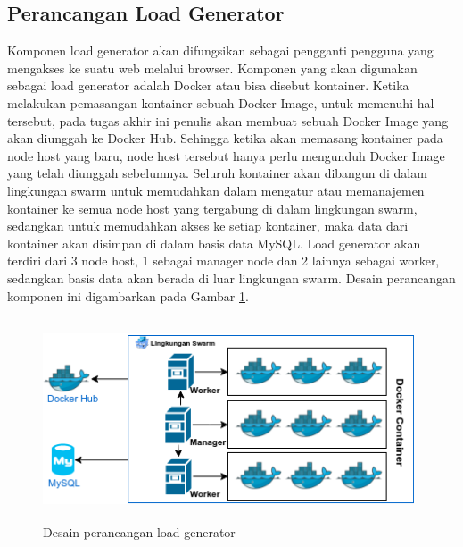     	\subsection{Perancangan Load Generator}
    		Komponen load generator akan difungsikan sebagai pengganti pengguna yang mengakses ke suatu web melalui browser. Komponen yang akan digunakan sebagai load generator adalah Docker atau bisa disebut kontainer. Ketika melakukan pemasangan kontainer sebuah Docker Image, untuk memenuhi hal tersebut, pada tugas akhir ini penulis akan membuat sebuah Docker Image yang akan diunggah ke Docker Hub. Sehingga ketika akan memasang kontainer pada node host yang baru, node host tersebut hanya perlu mengunduh Docker Image yang telah diunggah sebelumnya. Seluruh kontainer akan dibangun di dalam lingkungan swarm untuk memudahkan dalam mengatur atau memanajemen kontainer ke semua node host yang tergabung di dalam lingkungan swarm, sedangkan untuk memudahkan akses ke setiap kontainer, maka data dari kontainer akan disimpan di dalam basis data MySQL. Load generator akan terdiri dari 3 node host, 1 sebagai manager node dan 2 lainnya sebagai worker, sedangkan basis data akan berada di luar lingkungan swarm. Desain perancangan komponen ini digambarkan pada Gambar \ref{dockerdesain}.
    		\begin{figure}[H]
    			\centering
    			\includegraphics[width=11cm,height=6cm]{Images/C-3/dockerdesain.png}
    			\caption{Desain perancangan load generator}
    			\label{dockerdesain}
    		\end{figure} 
    	
